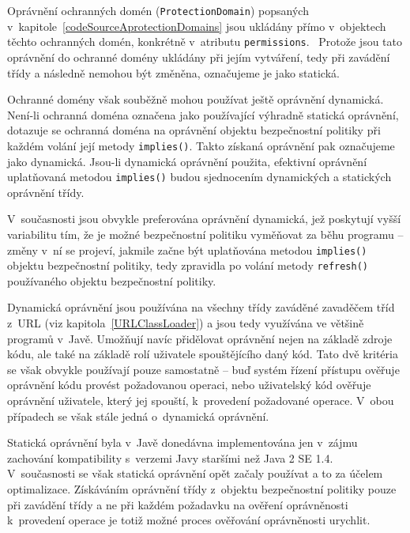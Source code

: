 Oprávnění ochranných domén ({\tt ProtectionDomain}) popsaných v~kapitole~\ref{codeSourceAprotectionDomains} jsou ukládány přímo v~objektech těchto ochranných domén,
konkrétně v~atributu {\tt permissions}.~\cite{sourceProtectionDomain}
Protože jsou tato oprávnění do ochranné domény ukládány při jejím vytváření, tedy při zavádění třídy a následně nemohou být změněna, označujeme je jako statická.

Ochranné domény však souběžně mohou používat ještě oprávnění dynamická. Není-li ochranná doména označena jako používající výhradně statická oprávnění,
dotazuje se ochranná doména na oprávnění objektu bezpečnostní politiky při každém volání její metody {\tt implies()}.
Takto získaná oprávnění pak označujeme jako dynamická.
Jsou-li dynamická oprávnění použita, efektivní oprávnění uplatňovaná metodou {\tt implies()} budou sjednocením dynamických a statických oprávnění třídy.
\cite{sourceProtectionDomain}

V~současnosti jsou obvykle preferována oprávnění dynamická, jež poskytují vyšší variabilitu tím, že je možné bezpečnostní politiku vyměňovat za běhu
programu -- změny v~ní se projeví, jakmile začne být uplatňována metodou {\tt implies()} objektu bezpečnostní politiky, tedy zpravidla po volání metody
{\tt refresh()} používaného objektu bezpečnostní politiky.

Dynamická oprávnění jsou používána na všechny třídy zaváděné zavaděčem tříd z~URL (viz kapitola~\ref{URLClassLoader}) a jsou tedy využívána ve většině programů v~Javě.
\cite{sourceURLClassLoader}
Umožňují navíc přidělovat oprávnění nejen na základě zdroje kódu, ale také na základě rolí uživatele spouštějícího daný kód. Tato dvě kritéria se však
obvykle používají pouze samostatně -- buď systém řízení přístupu ověřuje oprávnění kódu provést požadovanou operaci, nebo uživatelský kód ověřuje oprávnění
uživatele, který jej spouští, k~provedení požadované operace. V~obou případech se však stále jedná o~dynamická oprávnění.

Statická oprávnění byla v~Javě donedávna implementována jen v~zájmu zachování kompatibility s~verzemi Javy staršími než Java 2 SE 1.4.~\cite{sourceProtectionDomain}
V~současnosti se však statická oprávnění opět začaly používat a to za účelem optimalizace.
Získáváním oprávnění třídy z~objektu bezpečnostní politiky pouze při zavádění třídy a ne při každém požadavku na ověření oprávněnosti k~provedení operace je totiž možné proces ověřování oprávněnosti urychlit.

